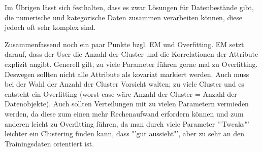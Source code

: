  Im Übrigen lässt sich festhalten, dass es zwar Lösungen für Datenbestände gibt,
 die numerische und kategorische Daten zusammen verarbeiten können, diese
 jedoch oft sehr komplex sind.
 
 Zusammenfassend noch ein paar Punkte bzgl. EM und Overfitting. EM setzt darauf,
 dass der User die Anzahl der Cluster und die Korrelationen der Attribute
 explizit angibt. Generell gilt, zu viele Parameter führen gerne mal zu Overfitting.
 Deswegen sollten nicht alle Attribute als kovariat markiert werden. Auch muss
 bei der Wahl der Anzahl der Cluster Vorsicht walten; zu viele Cluster und es
 entsteht ein Overfitting (worst case wäre Anzahl der Cluster = Anzahl der
 Datenobjekte). Auch sollten Verteilungen mit zu vielen Parametern vermieden werden,
 da diese zum einen mehr Rechenaufwand erfordern können und zum anderen
 leicht zu Overfitting führen, da man durch viele Parameter "'Tweaks"' leichter
 ein Clustering finden kann, dass "'gut aussieht"', aber zu sehr an den Trainingsdaten
 orientiert ist.